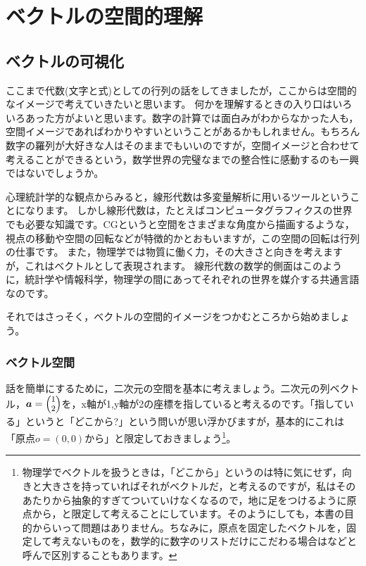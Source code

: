 \documentclass{ltjsbook}
\begin{document}
\chapter{ベクトルの空間的理解}
\label{L04_Space}
\section{ベクトルの可視化}
ここまで代数(文字と式)としての行列の話をしてきましたが，ここからは空間的なイメージで考えていきたいと思います。
何かを理解するときの入り口はいろいろあった方がよいと思います。数字の計算では面白みがわからなかった人も，空間イメージであればわかりやすいということがあるかもしれません。もちろん数字の羅列が大好きな人はそのままでもいいのですが，空間イメージと合わせて考えることができるという，数学世界の完璧なまでの整合性に感動するのも一興ではないでしょうか。

心理統計学的な観点からみると，線形代数は多変量解析に用いるツールということになります。
しかし線形代数は，たとえばコンピュータグラフィクスの世界でも必要な知識です。CGというと空間をさまざまな角度から描画するような，視点の移動や空間の回転などが特徴的かとおもいますが，この空間の回転は行列の仕事です。
また，物理学では物質に働く力，その大きさと向きを考えますが，これはベクトルとして表現されます。
線形代数の数学的側面はこのように，統計学や情報科学，物理学の間にあってそれぞれの世界を媒介する共通言語なのです。

それではさっそく，ベクトルの空間的イメージをつかむところから始めましょう。
\subsection{ベクトル空間}
話を簡単にするために，二次元の空間を基本に考えましょう。二次元の列ベクトル，$\footnotesize\bm{a} = \begin{pmatrix}1\\2 \end{pmatrix}$を，x軸が1,y軸が2の座標を指していると考えるのです。「指している」というと「どこから?」という問いが思い浮かびますが，基本的にこれは「原点$o=(0,0)$から」と限定しておきましょう\footnote{物理学でベクトルを扱うときは，「どこから」というのは特に気にせず，向きと大きさを持っていればそれがベクトルだ，と考えるのですが，私はそのあたりから抽象的すぎてついていけなくなるので，地に足をつけるように原点から，と限定して考えることにしています。そのようにしても，本書の目的からいって問題はありません。ちなみに，原点を固定したベクトルを，固定して考えないものを，数学的に数字のリストだけにこだわる場合はなどと呼んで区別することもあります\parencite{Murakami20160301}。}。
\end{document}
